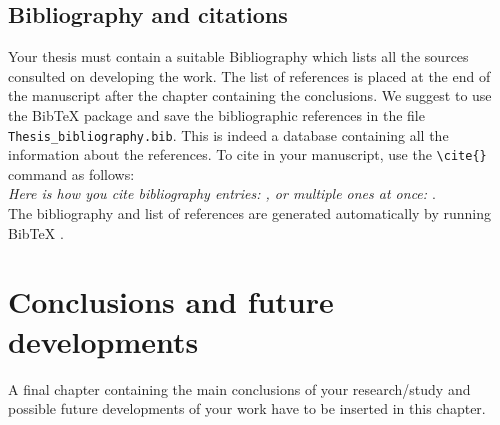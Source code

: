 \section{Bibliography and citations}
Your thesis must contain a suitable Bibliography which lists all the sources consulted on developing the work.
The list of references is placed at the end of the manuscript after the chapter containing the conclusions.
We suggest to use the BibTeX package and save the bibliographic references  in the file \verb|Thesis_bibliography.bib|.
This is indeed a database containing all the information about the references. To cite in your manuscript, use the \verb|\cite{}| command as follows:
\\
\textit{Here is how you cite bibliography entries: \cite{knuth74}, or multiple ones at once: \cite{knuth92,lamport94}}.
\\
The bibliography and list of references are generated automatically by running BibTeX \cite{bibtex}.

\chapter{Conclusions and future developments}
\label{ch:conclusions}%
A final chapter containing the main conclusions of your research/study
and possible future developments of your work have to be inserted in this chapter.
